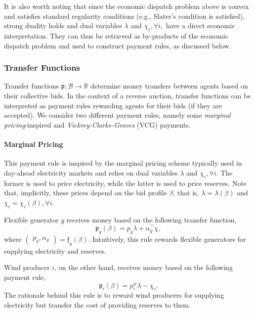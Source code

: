 \documentclass{article}
\begin{document}
It is also worth noting that since the economic dispatch problem above is convex and satisfies standard regularity conditions (e.g., Slater's condition is satisfied), strong duality holds and dual variables $\lambda$ and $\chi_i, \forall i,$ have a direct economic interpretation. They can thus be retrieved as by-products of the economic dispatch problem and used to construct payment rules, as discussed below.

\subsubsection{Transfer Functions}

Transfer functions $\mathfrak{p}: \mathcal{B} \rightarrow \mathbb{R}$ determine money transfers between agents based on their collective bids. In the context of a reverse auction, transfer functions can be interpreted as payment rules rewarding agents for their bids (if they are accepted). We consider two different payment rules, namely some \textit{marginal pricing}-inspired and \textit{Vickrey-Clarke-Groves} (VCG) payments.

\paragraph{Marginal Pricing} This payment rule is inspired by the marginal pricing scheme typically used in day-ahead electricity markets and relies on dual variables $\lambda$ and $\chi_i, \forall i$. The former is used to price electricity, while the latter is used to price reserves. Note that, implicitly, these prices depend on the bid profile $\beta$, that is, $\lambda = \lambda(\beta)$ and $\chi_i = \chi_i(\beta), \forall i$.

Flexible generator $g$ receives money based on the following transfer function,
\begin{equation*}
\mathfrak{p}_g(\beta) = p_g \lambda + \alpha_g^\top \chi,
\end{equation*}
where $\begin{pmatrix} p_g, \alpha_g \end{pmatrix} = \mathfrak{f}_g(\beta)$. Intuitively, this rule rewards flexible generators for supplying electricity and reserves.

Wind producer $i$, on the other hand, receives money based on the following payment rule,
\begin{equation*}
\mathfrak{p}_i(\beta) = p_i^w \lambda - \chi_i.
\end{equation*}
The rationale behind this rule is to reward wind producers for supplying electricity but transfer the cost of providing reserves to them.
\end{document}
